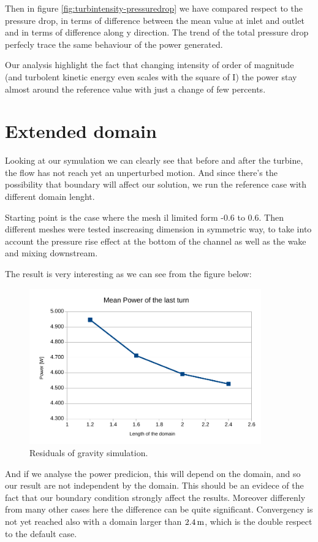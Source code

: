 \documentclass[a4paper,12pt]{article}
\begin{document}
Then in figure \ref{fig:turbintensity-pressuredrop} we have compared respect to the pressure drop, in terms of difference between the mean value at inlet and outlet and in terms of difference along y direction.
The trend of the total pressure drop perfecly trace the same behaviour of the power generated.

Our analysis highlight the fact that changing intensity of order of magnitude (and turbolent kinetic energy even scales with the square of I) the power stay almost around the reference value with just a change of few percents.

\section{Extended domain}
Looking at our symulation we can clearly see that before and after the turbine, the flow has not reach yet an unperturbed motion. And since there's the possibility that boundary will affect our solution, we run the reference case with different domain lenght. 

Starting point is the case where the mesh il limited form -0.6 to 0.6. 
Then different meshes were tested inscreasing dimension in symmetric way, to take into account the pressure rise effect at the bottom of the channel as well as the wake and mixing downstream. 

The result is very interesting as we can see from the figure below:
\begin{figure}[H]
\centering
\includegraphics[width=10cm]{images/longmesh/power.pdf}
\caption{Residuals of gravity simulation.}
\end{figure}
And if we analyse the power predicion, this will depend on the domain, and so our result are not independent by the domain. This should be an evidece of the fact that our boundary condition strongly affect the results.
Moreover differenly from many other cases here the difference can be quite significant.
Convergency is not yet reached also with a domain larger than $2.4\,\text{m}$, which is the double respect to the default case.%
\end{document}
